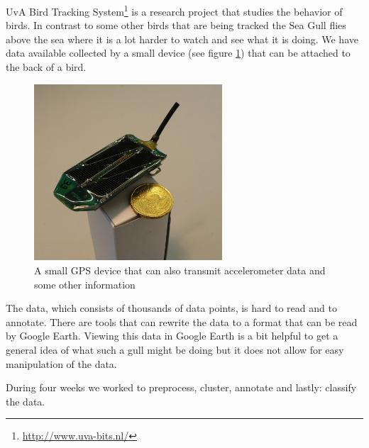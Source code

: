 UvA Bird Tracking System\footnote{\url{http://www.uva-bits.nl/} } is a research 
project that studies the behavior of
birds. 
In contrast to some other birds that are being tracked the Sea Gull flies above the 
sea where it is a lot harder to watch and see what it is doing. We have data available
collected by a small device (see figure \ref{fig:gpsDevice}) that can be attached to 
the back of a bird. 

\begin{figure}
    \center
    \includegraphics[width=7cm]{device}
    \caption{A small GPS device that can also transmit accelerometer data and some other
information}
    \label{fig:gpsDevice}
\end{figure}

The data, which consists of thousands of data points, is hard to read and to annotate. 
There are tools that can rewrite the data to a format that can be read by Google Earth. 
Viewing this data in Google Earth is a bit helpful to get a general idea of what such 
a gull might be doing but it does not allow for easy manipulation of the data. 

During four weeks we worked to preprocess, cluster, annotate
and lastly: classify the data. 


